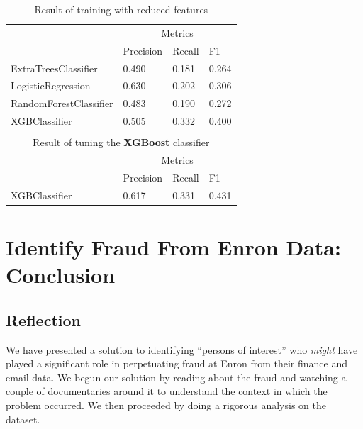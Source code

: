 \documentclass[twoside,openright,titlepage,numbers=noenddot,headinclude,%
               footinclude=true,cleardoublepage=empty,abstractoff,BCOR=5mm,%
               paper=a4,fontsize=11pt,ngerman,american]{scrreprt}
\numberwithin{theorem}{chapter}
\numberwithin{definition}{chapter}
\numberwithin{algorithm}{chapter}
\numberwithin{figure}{chapter}
\numberwithin{table}{chapter}
\numberwithin{equation}{chapter}
\begin{document}
\setlength{\extrarowheight}{1.5pt}
\begin{table}[!htbp]
\caption{Result of training with reduced features} %
\centering %
\begin{tabular}{|p{6cm}|p{1.5cm}|p{1.5cm}|p{1.5cm}|} %
\hline %
& \multicolumn{3}{c|}{Metrics}\\[5pt]
\cline{2-4} 
& Precision & Recall & F1\\[0.5ex]
\hline %

ExtraTreesClassifier     &  0.490       &  0.181     &  0.264     \\ 
LogisticRegression       &  0.630       &  0.202     &  0.306     \\ 
RandomForestClassifier   &  0.483       &  0.190     &  0.272     \\ 
XGBClassifier            &  0.505       &  0.332     &  0.400     \\ 
\hline%

\multicolumn{4}{|c|}{}\\
\multicolumn{4}{|c|}{Result of tuning the \textbf{XGBoost} classifier}\\[5pt]
\hline
& \multicolumn{3}{c|}{Metrics}\\[5pt]
\cline{2-4} 
& Precision & Recall & F1\\[0.5ex]
\hline %

XGBClassifier           &  0.617  & 0.331  & 0.431\\ 
\hline
\end{tabular}
\label{tableReducedFeatures}
\end{table} 


\chapter*{Identify Fraud From Enron Data: Conclusion}


\section*{Reflection}

We have presented a solution to identifying ``persons of interest'' who \textit{might} have played a significant role in perpetuating fraud at Enron from their finance and email data. We begun our solution by reading about the fraud and watching a couple of documentaries around it to understand the context in which the problem occurred. We then proceeded by doing a rigorous analysis on the dataset. 
\end{document}
